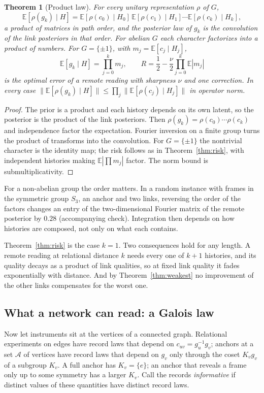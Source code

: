 \documentclass[11pt,a4paper]{article}
\newtheorem{theorem}[definition]{Theorem}
\newcommand{\E}{\mathbb E}
\begin{document}
\begin{theorem}[Product law]\label{thm:product}
For every unitary representation $\rho$ of $G$,
\[
 \E[\rho(g_k)\mid H]=\E[\rho(c_0)\mid H_0]\,\E[\rho(c_1)\mid H_1]\cdots\E[\rho(c_k)\mid H_k],
\]
a product of matrices in path order, and the posterior law of $g_k$ is the convolution of the link posteriors in that order. For abelian $G$ each character factorizes into a product of numbers. For $G=\{\pm1\}$, with $m_j=\E[c_j\mid H_j]$,
\[
 \E[g_k\mid H]=\prod_{j=0}^km_j,\qquad
 R=\frac12-\frac\nu2\prod_{j=0}^k\E|m_j|
\]
is the optimal error of a remote reading with sharpness $\nu$ and one correction. In every case $\|\E[\rho(g_k)\mid H]\|\le\prod_j\|\E[\rho(c_j)\mid H_j]\|$ in operator norm.
\end{theorem}
\begin{proof}
The prior is a product and each history depends on its own latent, so the posterior is the product of the link posteriors. Then $\rho(g_k)=\rho(c_0)\cdots\rho(c_k)$ and independence factor the expectation. Fourier inversion on a finite group turns the product of transforms into the convolution. For $G=\{\pm1\}$ the nontrivial character is the identity map; the risk follows as in Theorem~\ref{thm:risk}, with independent histories making $\E|\prod m_j|$ factor. The norm bound is submultiplicativity.
\end{proof}

For a non-abelian group the order matters. In a random instance with frames in the symmetric group $S_3$, an anchor and two links, reversing the order of the factors changes an entry of the two-dimensional Fourier matrix of the remote posterior by $0.28$ (accompanying check). Integration then depends on how histories are composed, not only on what each contains.

Theorem~\ref{thm:risk} is the case $k=1$. Two consequences hold for any length. A remote reading at relational distance $k$ needs every one of $k+1$ histories, and its quality decays as a product of link qualities, so at fixed link quality it fades exponentially with distance. And by Theorem~\ref{thm:weakest} no improvement of the other links compensates for the worst one.

\subsection{What a network can read: a Galois law}

Now let instruments sit at the vertices of a connected graph. Relational experiments on edges have record laws that depend on $c_{uv}=g_u^{-1}g_v$; anchors at a set $\mathcal A$ of vertices have record laws that depend on $g_v$ only through the coset $K_vg_v$ of a subgroup $K_v$. A full anchor has $K_v=\{e\}$; an anchor that reveals a frame only up to some symmetry has a larger $K_v$. Call the records \emph{informative} if distinct values of these quantities have distinct record laws.
\end{document}
